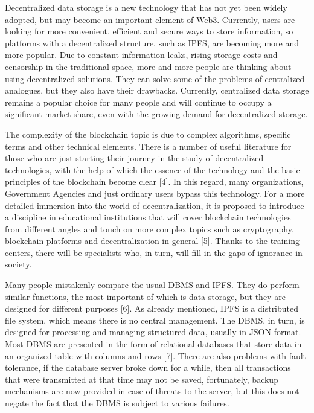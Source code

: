 \documentclass[10pt,conference,a4paper]{IEEEtran_EDM}
\begin{document}
Decentralized data storage is a new technology that has not yet been widely adopted, but may become an important element of Web3. Currently, users are looking for more convenient, efficient and secure ways to store information, so platforms with a decentralized structure, such as IPFS, are becoming more and more popular. Due to constant information leaks, rising storage costs and censorship in the traditional space, more and more people are thinking about using decentralized solutions. They can solve some of the problems of centralized analogues, but they also have their drawbacks. Currently, centralized data storage remains a popular choice for many people and will continue to occupy a significant market share, even with the growing demand for decentralized storage.

The complexity of the blockchain topic is due to complex algorithms, specific terms and other technical elements. There is a number of useful literature for those who are just starting their journey in the study of decentralized technologies, with the help of which the essence of the technology and the basic principles of the blockchain become clear [4]. In this regard, many organizations, Government Agencies and just ordinary users bypass this technology. For a more detailed immersion into the world of decentralization, it is proposed to introduce a discipline in educational institutions that will cover blockchain technologies from different angles and touch on more complex topics such as cryptography, blockchain platforms and decentralization in general [5]. Thanks to the training centers, there will be specialists who, in turn, will fill in the gaps of ignorance in society. 

Many people mistakenly compare the usual DBMS and IPFS. They do perform similar functions, the most important of which is data storage, but they are designed for different purposes [6]. As already mentioned, IPFS is a distributed file system, which means there is no central management. The DBMS, in turn, is designed for processing and managing structured data, usually in JSON format. Most DBMS are presented in the form of relational databases that store data in an organized table with columns and rows [7]. There are also problems with fault tolerance, if the database server broke down for a while, then all transactions that were transmitted at that time may not be saved, fortunately, backup mechanisms are now provided in case of threats to the server, but this does not negate the fact that the DBMS is subject to various failures. 
\end{document}
